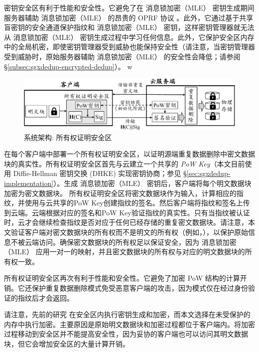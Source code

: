 密钥安全区有利于性能和安全性。它避免了在 消息锁加密（MLE） 密钥生成期间服务器辅助 消息锁加密（MLE） 的昂贵的 OPRF 协议 \cite{bellare2013DupLESS}。此外，它通过基于共享盲密钥的安全通道保护指纹和 消息锁加密（MLE） 密钥，这样密钥管理器就无法从 消息锁加密（MLE） 密钥生成过程中学习任何信息。此外，它保护安全区内存中的全局机密，即使密钥管理器受到威胁也能保持安全性（请注意，当密钥管理器受到威胁时，原始服务器辅助 消息锁加密（MLE） 的安全性会降低；请参阅 \S\ref{subsec:sgxdedup-encrypted-dedup}）。
  w
\begin{figure}[!htb]
  \centering
  \includegraphics[width=\textwidth]{pic/sgxdedup/pow.pdf}
  \caption{\sysnameS 系统架构: 所有权证明安全区}
  \label{fig:sgxdedup-overview-pow}
  \vspace{-3pt}
\end{figure}

\sysnameS 在每个客户端中部署一个所有权证明安全区，以证明源端重复数据删除中密文数据块的真实性。所有权证明安全区首先与云建立一个共享的 \textit{PoW Key}（本文目前使用 Diffie-Hellman 密钥交换 (DHKE) 实现密钥协商；参见 \S\ref{sec:sgxdedup-implementation}）。生成 消息锁加密（MLE） 密钥后，客户端将每个明文数据块加密为密文数据块。 所有权证明安全区将密文数据块作为输入，计算相应的指纹，并使用与云共享的PoW Key创建指纹的签名。然后客户端将指纹和签名上传到云端。云端根据对应的签名和PoW Key验证指纹的真实性。只有当指纹被认证时，云才会继续检查指纹是否对应于任何已经存储的重复密文数据块。请注意，本文验证客户端对密文数据块的所有权而不是明文的所有权（例如，\cite{halevi11}），以保护原始信息不被云端访问。确保密文数据块的所有权足以保证安全，因为 消息锁加密（MLE） 应用一对一的映射，并且密文数据块的所有权与对应的明文数据块的所有权一致。

所有权证明安全区再次有利于性能和安全性。它避免了加密 PoW 结构的计算开销。它还保护重复数据删除模式免受恶意客户端的攻击，因为模式仅在经过身份验证的指纹后才会返回。

请注意，先前的研究 \cite{kim19,fuhry20,djoko19} 在安全区内执行密钥生成和加密，而本文选择在未受保护的内存中执行加密。主要原因是原始明文数据块和加密过程都位于客户端内。将加密过程移动到安全区并不能提高安全性，因为妥协的客户端也可以访问其明文数据块，但它会增加安全区的大量计算开销。


